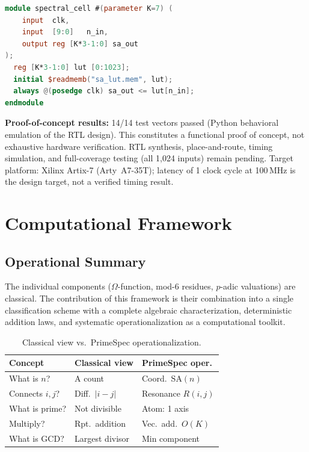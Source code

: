 \documentclass[10pt,twocolumn]{article}
\newcommand{\SA}{\mathrm{SA}}
\newcommand{\Om}{\Omega}
\begin{document}
\begin{lstlisting}[language=Verilog]
module spectral_cell #(parameter K=7) (
    input  clk,
    input  [9:0]   n_in,
    output reg [K*3-1:0] sa_out
);
  reg [K*3-1:0] lut [0:1023];
  initial $readmemb("sa_lut.mem", lut);
  always @(posedge clk) sa_out <= lut[n_in];
endmodule
\end{lstlisting}

\noindent\textbf{Proof-of-concept results:} 14/14 test vectors passed
(Python behavioral emulation of the RTL design). This constitutes a
functional proof of concept, not exhaustive hardware verification.
RTL synthesis, place-and-route, timing simulation, and full-coverage
testing (all 1{,}024 inputs) remain pending. Target platform:
Xilinx Artix-7 (Arty~A7-35T); latency of 1 clock cycle at 100\,MHz is
the design target, not a verified timing result.

\section{Computational Framework}

\subsection{Operational Summary}

The individual components ($\Om$-function, mod-6 residues, $p$-adic
valuations) are classical. The contribution of this framework is their
combination into a single classification scheme with a complete algebraic
characterization, deterministic addition laws, and systematic
operationalization as a computational toolkit.

\begin{table}[htbp]
\centering
\small
\setlength{\tabcolsep}{4pt}
\begin{tabularx}{\columnwidth}{@{}lXX@{}}
\toprule
Concept & Classical view & PrimeSpec oper. \\
\midrule
What is $n$?    & A count           & Coord.\ $\SA(n)$ \\
Connects $i,j$? & Diff.\ $|i{-}j|$ & Resonance $R(i,j)$ \\
What is prime?  & Not divisible     & Atom: 1 axis \\
Multiply?       & Rpt.\ addition    & Vec.\ add.\ $O(K)$ \\
What is GCD?    & Largest divisor   & Min component \\
\bottomrule
\end{tabularx}
\caption{Classical view vs.\ PrimeSpec operationalization.}
\end{table}
\end{document}
